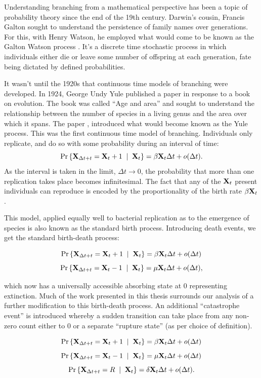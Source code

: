 Understanding branching from a mathematical perspective has been a topic of probability theory since the end of the 19th century. Darwin's cousin, Francis Galton sought to understand the persistence of family names over generations. For this, with Henry Watson, he employed what would come to be known as the Galton Watson process  \cite{watson1875probability}. It's a discrete time stochastic process in which individuals either die or leave some number of offspring at each generation, fate being dictated by defined probabilities.\par 

It wasn't until the 1920s that continuous time models of branching were developed. In 1924, George Undy Yule published a paper in response to a book on evolution. The book was called ``Age and area'' and sought to understand the relationship between the number of species in a living genus and the area over which it spans. The paper  \cite{yule1925ii}, introduced what would become known as the Yule process. This was the first continuous time model of branching. Individuals only replicate, and do so with some probability during an interval of time:
$${\text{Pr}\left\{{\bf X}_{\Delta t + t}  = {{\bf X}_t} + 1 \;\; | \;\; {{\bf X}_t}\right\}} = \beta {{\bf X}_t} \Delta t + o(\Delta t).$$
As the interval is taken in the limit, $\Delta t\to 0$, the probability that more than one replication takes place becomes infinitesimal. The fact that any of the ${{\bf X}_t}$ present individuals can reproduce is encoded by the proportionality of the birth rate $\beta {{\bf X}_t}$.\par This model, applied equally well to bacterial replication as to the emergence of species is also known as the standard birth process. Introducing death events, we get the standard birth-death process:

$${\text{Pr}\left\{{\bf X}_{\Delta t + t}  = {{\bf X}_t} + 1 \;\; | \;\; {{\bf X}_t}\right\}} = \beta {{\bf X}_t} \Delta t + o(\Delta t)$$
$${\text{Pr}\left\{{\bf X}_{\Delta t + t}  = {{\bf X}_t} - 1 \;\; | \;\; {{\bf X}_t}\right\}} = \mu {{\bf X}_t} \Delta t + o(\Delta t),$$

\noindent
which now has a universally accessible absorbing state at 0 representing extinction. Much of the work presented in this thesis surrounds our analysis of a further modification to this birth-death process. An additional ``catastrophe event'' is introduced whereby a sudden transition can take place from any non-zero count either to 0 or a separate ``rupture state'' (as per choice of definition).

$${\text{Pr}\left\{{\bf X}_{\Delta t + t}  = {{\bf X}_t} + 1 \;\; | \;\; {{\bf X}_t}\right\}} = \beta {{\bf X}_t} \Delta t + o(\Delta t)$$
$${\text{Pr}\left\{{\bf X}_{\Delta t + t}  = {{\bf X}_t} - 1 \;\; | \;\; {{\bf X}_t}\right\}} = \mu {{\bf X}_t} \Delta t + o(\Delta t)$$
$${\text{Pr}\left\{{\bf X}_{\Delta t + t}  = R \;\; | \;\; {{\bf X}_t}\right\}} = \delta {{\bf X}_t} \Delta t + o(\Delta t).$$

